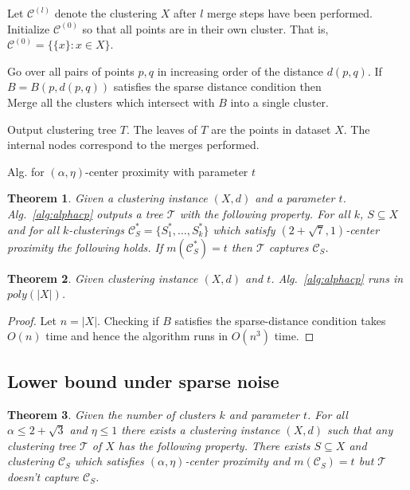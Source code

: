 \documentclass[12pt]{article}
\newtheorem{theorem}{Theorem}
\newcommand{\mc}{\mathcal}
\begin{document}
\begin{algorithm}
\Indp{}
	
\vspace{0.1in} Let $\mc C^{(l)}$ denote the clustering $X$ after $l$ merge steps have been performed. Initialize $\mc C^{(0)}$ so that all points are in their own cluster. That is, $\mc C^{(0)} = \{ \{x\}: x \in X\}$.
	
	Go over all pairs of points $p, q$ in increasing order of the distance $d(p, q)$. If $B = B(p, d(p, q))$ satisfies the sparse distance condition then\\
	Merge all the clusters which intersect with $B$ into a single cluster.
	
	\vspace{0.1in}Output clustering tree $T$. The leaves of $T$ are the points in dataset $X$. The internal nodes correspond to the merges performed.
\caption{Alg. for $(\alpha, \eta)$-center proximity with parameter $t$}	
\label{alg:alphacp}
\end{algorithm}
\vspace{-.1in}
\begin{theorem}
\label{thm:alphacpnoise}
Given a clustering instance $(X, d)$ and a parameter $t$. Alg.~\ref{alg:alphacp} outputs a tree $\mc T$ with the following property. For all $k$, $S \subseteq X$ and for all $k$-clusterings $\mc C^*_{S} = \{S_1^*, \ldots, S_k^*\}$ which satisfy $(2+\sqrt{7}, 1)$-center proximity the following holds. If $m(\mc C_{S}^*) = t$ then $\mc T$ captures $\mc C_{S}$.
\end{theorem}

\begin{theorem}
\label{thm:algcptime}
Given clustering instance $(X, d)$ and $t$. Alg.~\ref{alg:alphacp} runs in  $poly(|X|)$.
\end{theorem}

\begin{proof}
Let $n = |X|$. Checking if $B$ satisfies the sparse-distance condition takes $O(n)$ time and hence the algorithm runs in $O(n^3)$ time.
\end{proof}

\subsection{Lower bound under sparse noise}
\label{section:alphaLowerBoundSparse}
\begin{theorem}
\label{thm:noalgalphacp}
Given the number of clusters $k$ and parameter $t$. For all $\alpha \le 2+\sqrt{3}$ and $\eta \le 1$ there exists a clustering instance $(X, d)$ such that any clustering tree $\mc T$ of $X$ has  the following property. There exists $S \subseteq X$ and clustering $\mc C_{S}$ which satisfies $(\alpha, \eta)$-center proximity and $ m(\mc C_{S}) = t$ but $\mc T$ doesn't capture $\mc C_{S}$.
\end{theorem}
\end{document}
